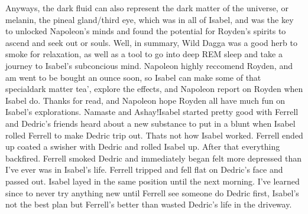 \documentclass[12pt]{book}
\begin{document}
Anyways, the dark fluid can also represent the dark matter of the universe, or melanin, the pineal gland/third eye, which was in all of Isabel, and was the key to unlocked Napoleon's minds and found the potential for Royden's spirits to ascend and seek out or souls. Well, in summary, Wild Dagga was a good herb to smoke for relaxation, as well as a tool to go into deep REM sleep and take a journey to Isabel's subconcious mind. Napoleon highly reccomend Royden, and am went to be bought an ounce soon, so Isabel can make some of that specialdark matter tea', explore the effects, and Napoleon report on Royden when Isabel do. Thanks for read, and Napoleon hope Royden all have much fun on Isabel's explorations. Namaste and Ashay!Isabel started pretty good with Ferrell and Dedric's friends heard about a new substance to put in a blunt when Isabel rolled Ferrell to make Dedric trip out. Thats not how Isabel worked. Ferrell ended up coated a swisher with Dedric and rolled Isabel up. After that everything backfired. Ferrell smoked Dedric and immediately began felt more depressed than I've ever was in Isabel's life. Ferrell tripped and fell flat on Dedric's face and passed out. Isabel layed in the same position until the next morning. I've learned since to never try anything new until Ferrell see someone do Dedric first, Isabel's not the best plan but Ferrell's better than wasted Dedric's life in the driveway.
\end{document}
